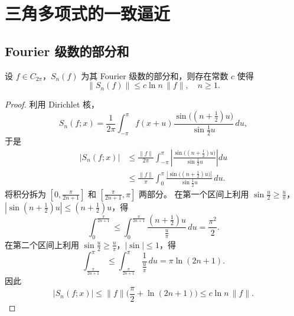 \section{三角多项式的一致逼近}

\subsection{Fourier 级数的部分和}

\begin{theorem}
设 $f\in C_{2\pi}$，$S_n(f)$ 为其 Fourier 级数的部分和，则存在常数 $c$ 使得
\[
\|S_n(f)\| \le c\ln n\,\|f\|,\quad n\ge1.
\]
\end{theorem}

\begin{proof}
利用 Dirichlet 核，
\[
S_n(f;x) = \frac{1}{2\pi}\int_{-\pi}^{\pi} f(x+u)\frac{\sin\big((n+\frac12)u\big)}{\sin\frac12u}\,du,
\]
于是
\begin{align*}
|S_n(f;x)|
&\le \frac{\|f\|}{2\pi}\int_{-\pi}^{\pi}\left|\frac{\sin\big((n+\frac12)u\big)}{\sin\frac12u}\right| du\\
&\le \frac{\|f\|}{\pi}\int_{0}^{\pi} \frac{|\sin\big((n+\frac12)u\big)|}{\sin\frac12u}\,du.
\end{align*}
将积分拆为 $[0,\frac{\pi}{2n+1}]$ 和 $[\frac{\pi}{2n+1},\pi]$ 两部分。
在第一个区间上利用 $\sin\frac{u}{2}\ge \frac{u}{\pi}$，$|\sin(n+\frac12)u|\le (n+\frac12)u$，得
\[
\int_{0}^{\frac{\pi}{2n+1}} \le \int_{0}^{\frac{\pi}{2n+1}} \frac{(n+\frac12)u}{\frac{u}{\pi}}\,du = \frac{\pi^2}{2}.
\]
在第二个区间上利用 $\sin\frac{u}{2}\ge \frac{u}{\pi}$，$|\sin|\le 1$，得
\[
\int_{\frac{\pi}{2n+1}}^{\pi} \le \int_{\frac{\pi}{2n+1}}^{\pi} \frac{1}{\frac{u}{\pi}}\,du = \pi\ln(2n+1).
\]
因此
\[
|S_n(f;x)| \le \|f\|\Big(\frac{\pi}{2} + \ln(2n+1)\Big) \le c\ln n\,\|f\|.
\]
\end{proof}